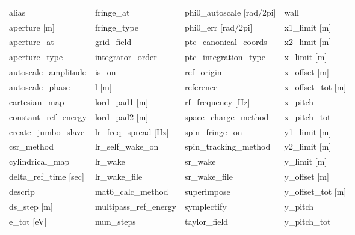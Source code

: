  \begin{tabular}{llll} \toprule
alias                          & fringe_at                      & phi0_autoscale [rad/2pi]       & wall                           \\
aperture [m]                   & fringe_type                    & phi0_err [rad/2pi]             & x1_limit [m]                   \\
aperture_at                    & grid_field                     & ptc_canonical_coords           & x2_limit [m]                   \\
aperture_type                  & integrator_order               & ptc_integration_type           & x_limit [m]                    \\
autoscale_amplitude            & is_on                          & ref_origin                     & x_offset [m]                   \\
autoscale_phase                & l [m]                          & reference                      & x_offset_tot [m]               \\
cartesian_map                  & lord_pad1 [m]                  & rf_frequency [Hz]              & x_pitch                        \\
constant_ref_energy            & lord_pad2 [m]                  & space_charge_method            & x_pitch_tot                    \\
create_jumbo_slave             & lr_freq_spread [Hz]            & spin_fringe_on                 & y1_limit [m]                   \\
csr_method                     & lr_self_wake_on                & spin_tracking_method           & y2_limit [m]                   \\
cylindrical_map                & lr_wake                        & sr_wake                        & y_limit [m]                    \\
delta_ref_time [sec]           & lr_wake_file                   & sr_wake_file                   & y_offset [m]                   \\
descrip                        & mat6_calc_method               & superimpose                    & y_offset_tot [m]               \\
ds_step [m]                    & multipass_ref_energy           & symplectify                    & y_pitch                        \\
e_tot [eV]                     & num_steps                      & taylor_field                   & y_pitch_tot                    \\

\end{tabular}
